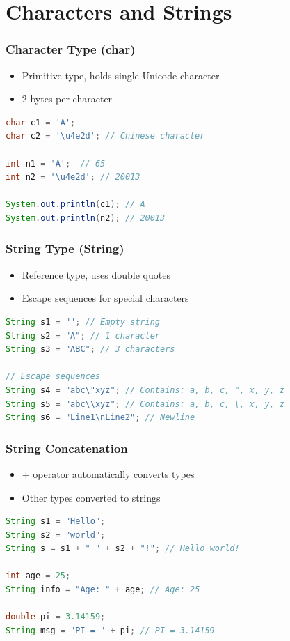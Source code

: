\documentclass[serif, aspectratio=169]{beamer}
\begin{document}
\section{Characters and Strings}
\begin{frame}[fragile]
\frametitle{Character Type (char)}
\begin{itemize}
    \item Primitive type, holds single Unicode character
    \item 2 bytes per character
\end{itemize}
\begin{lstlisting}[language=Java]
char c1 = 'A';
char c2 = '\u4e2d'; // Chinese character

int n1 = 'A';  // 65
int n2 = '\u4e2d'; // 20013

System.out.println(c1); // A
System.out.println(n2); // 20013
\end{lstlisting}
\end{frame}

\begin{frame}[fragile]
\frametitle{String Type (String)}
\begin{itemize}
    \item Reference type, uses double quotes
    \item Escape sequences for special characters
\end{itemize}
\begin{lstlisting}[language=Java]
String s1 = ""; // Empty string
String s2 = "A"; // 1 character
String s3 = "ABC"; // 3 characters

// Escape sequences
String s4 = "abc\"xyz"; // Contains: a, b, c, ", x, y, z
String s5 = "abc\\xyz"; // Contains: a, b, c, \, x, y, z
String s6 = "Line1\nLine2"; // Newline
\end{lstlisting}
\end{frame}

\begin{frame}[fragile]
\frametitle{String Concatenation}
\begin{itemize}
    \item + operator automatically converts types
    \item Other types converted to strings
\end{itemize}
\begin{lstlisting}[language=Java]
String s1 = "Hello";
String s2 = "world";
String s = s1 + " " + s2 + "!"; // Hello world!

int age = 25;
String info = "Age: " + age; // Age: 25

double pi = 3.14159;
String msg = "PI = " + pi; // PI = 3.14159
\end{lstlisting}
\end{frame}
\end{document}
